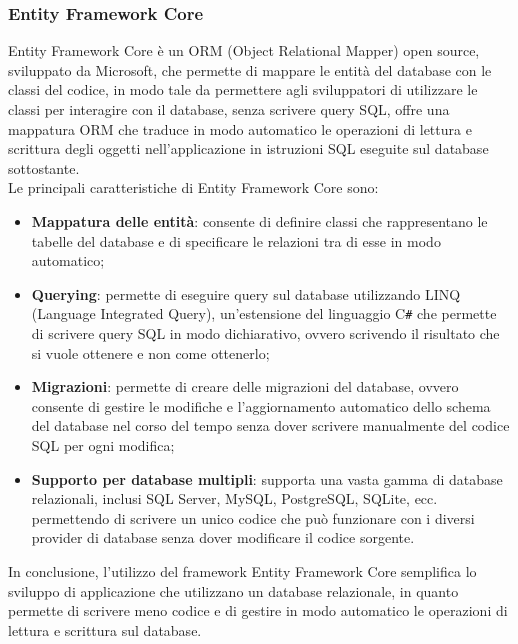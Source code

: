 \subsubsection{Entity Framework Core}
Entity Framework Core è un ORM (Object Relational Mapper) open source, sviluppato da Microsoft, che permette di mappare le entità del database con le classi del codice, in modo tale da permettere agli sviluppatori di utilizzare le classi per interagire con il database, senza scrivere query SQL, offre una mappatura ORM che traduce in modo automatico le operazioni di lettura e scrittura degli oggetti nell'applicazione in istruzioni SQL eseguite sul database sottostante.\\
Le principali caratteristiche di Entity Framework Core sono:
\begin{itemize}
\item \textbf{Mappatura delle entità}: consente di definire classi che rappresentano le tabelle del database e di specificare le relazioni tra di esse in modo automatico;
\item \textbf{Querying}: permette di eseguire query sul database utilizzando LINQ (Language Integrated Query), un'estensione del linguaggio C\texttt{\#} che permette di scrivere query SQL in modo dichiarativo, ovvero scrivendo il risultato che si vuole ottenere e non come ottenerlo;
\item \textbf{Migrazioni}: permette di creare delle migrazioni del database, ovvero consente di gestire le modifiche e l'aggiornamento automatico dello schema del database nel corso del tempo senza dover scrivere manualmente del codice SQL per ogni modifica;
\item \textbf{Supporto per database multipli}: supporta una vasta gamma di database relazionali, inclusi SQL Server, MySQL, PostgreSQL, SQLite, ecc. permettendo di scrivere un unico codice che può funzionare con i diversi provider di database senza dover modificare il codice sorgente.
\end{itemize}
In conclusione, l'utilizzo del framework Entity Framework Core semplifica lo sviluppo di applicazione che utilizzano un database relazionale, in quanto permette di scrivere meno codice e di gestire in modo automatico le operazioni di lettura e scrittura sul database.\\
